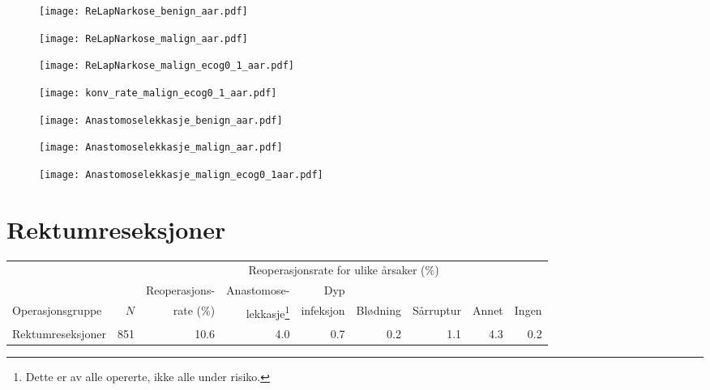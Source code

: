 \documentclass[norsk,a4paper]{article}\usepackage[]{graphicx}\usepackage[]{color}
\begin{document}
\begin{figure}[ht]
\centering
\texttt{[image: ReLapNarkose\_benign\_aar.pdf]}
\caption{}
\end{figure}

\begin{figure}[ht]
\centering
\texttt{[image: ReLapNarkose\_malign\_aar.pdf]}
\caption{}
\end{figure}

\begin{figure}[ht]
\centering
\texttt{[image: ReLapNarkose\_malign\_ecog0\_1\_aar.pdf]}
\caption{}
\end{figure}

\begin{figure}[ht]
\centering
\texttt{[image: konv\_rate\_malign\_ecog0\_1\_aar.pdf]}
\caption{}
\end{figure}

\begin{figure}[ht]
\centering
\texttt{[image: Anastomoselekkasje\_benign\_aar.pdf]}
\caption{}
\end{figure}

\begin{figure}[ht]
\centering
\texttt{[image: Anastomoselekkasje\_malign\_aar.pdf]}
\caption{}
\end{figure}

\begin{figure}[ht]
\centering
\texttt{[image: Anastomoselekkasje\_malign\_ecog0\_1aar.pdf]}
\caption{}
\end{figure}

\clearpage

\section{Rektumreseksjoner}

\begin{table}[htb]
\begin{minipage}{\textwidth}
\centering
\begin{tabular}{lrrrrrrrr}
  \toprule
  & & & \multicolumn{4}{c}{Reoperasjonsrate for ulike årsaker (\%)} \\
 \cline{4-9} 
 & & Reoperasjons- & Anastomose- & Dyp &&&&  \\
 Operasjonsgruppe & $N$ & rate (\%) & lekkasje\footnote[2]{Dette er av alle opererte, ikke
alle under risiko.} & infeksjon & Blødning & Sårruptur & Annet & Ingen \\
 \midrule
Rektumreseksjoner & 851 & 10.6 & 4.0 & 0.7 & 0.2 & 1.1 & 4.3 & 0.2 \\ 
   \bottomrule
\end{tabular}

\end{minipage}
\end{table}
\end{document}
